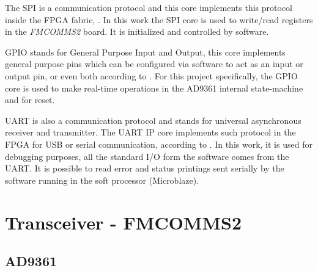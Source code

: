 
The SPI is a communication protocol and this core implements this protocol
inside the FPGA fabric, \cite{xilinx:axiquadspi}. In this work the SPI core
is used to write/read registers in the \emph{FMCOMMS2} board. It is
initialized and controlled by software.


GPIO stands for General Purpose Input and Output, this core implements general
purpose pins which can be configured via software to act as an input or output
pin, or even both according to \cite{xilinx:axigpio}. For this project
specifically, the GPIO core is used to make real-time operations in the AD9361
internal state-machine and for reset.


UART is also a communication protocol and stands for universal asynchronous
receiver and transmitter. The UART IP core implements such protocol in the
FPGA for USB or serial communication, according to \cite{xilinx:axiuart}. In
this work, it is used for debugging purposes, all the standard I/O form the
software comes from the UART. It is possible to read error and status
printings sent serially by the software running in the soft processor
(Microblaze).



\section{Transceiver - FMCOMMS2}

\subsection{AD9361}
\label{trans:ad9361}


